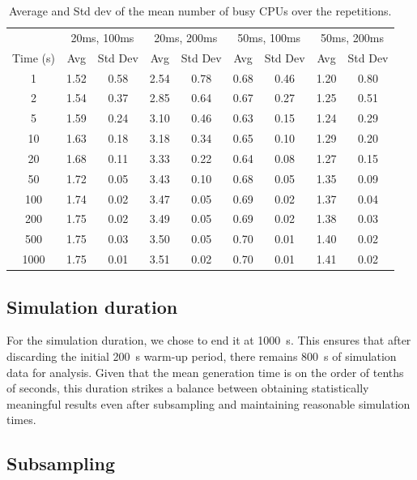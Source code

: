 \begin{table}[H]
\centering
\begin{tabular}{c|cc|cc|cc|cc}
 & \multicolumn{2}{c|}{20ms, 100ms} & \multicolumn{2}{c|}{20ms, 200ms} & \multicolumn{2}{c|}{50ms, 100ms} & \multicolumn{2}{c}{50ms, 200ms} \\
 Time (s) & Avg & Std Dev & Avg & Std Dev & Avg & Std Dev & Avg & Std Dev \\
\midrule
1 & 1.52 & 0.58 & 2.54 & 0.78 & 0.68 & 0.46 & 1.20 & 0.80 \\
2 & 1.54 & 0.37 & 2.85 & 0.64 & 0.67 & 0.27 & 1.25 & 0.51 \\
5 & 1.59 & 0.24 & 3.10 & 0.46 & 0.63 & 0.15 & 1.24 & 0.29 \\
10 & 1.63 & 0.18 & 3.18 & 0.34 & 0.65 & 0.10 & 1.29 & 0.20 \\
20 & 1.68 & 0.11 & 3.33 & 0.22 & 0.64 & 0.08 & 1.27 & 0.15 \\
50 & 1.72 & 0.05 & 3.43 & 0.10 & 0.68 & 0.05 & 1.35 & 0.09 \\
100 & 1.74 & 0.02 & 3.47 & 0.05 & 0.69 & 0.02 & 1.37 & 0.04 \\
200 & 1.75 & 0.02 & 3.49 & 0.05 & 0.69 & 0.02 & 1.38 & 0.03 \\
500 & 1.75 & 0.03 & 3.50 & 0.05 & 0.70 & 0.01 & 1.40 & 0.02 \\
1000 & 1.75 & 0.01 & 3.51 & 0.02 & 0.70 & 0.01 & 1.41 & 0.02 \\
\end{tabular}
\caption{Average and Std dev of the mean number of busy CPUs over the repetitions.}
\label{tab:stabilization}
\end{table}

\subsection{Simulation duration}

For the simulation duration, we chose to end it at \SI{1000}{\second}. This ensures that after discarding the initial \SI{200}{\second} warm-up period, there remains \SI{800}{\second} of simulation data for analysis. Given that the mean generation time is on the order of tenths of seconds, this duration strikes a balance between obtaining statistically meaningful results even after subsampling and maintaining reasonable simulation times.


\subsection{Subsampling}

